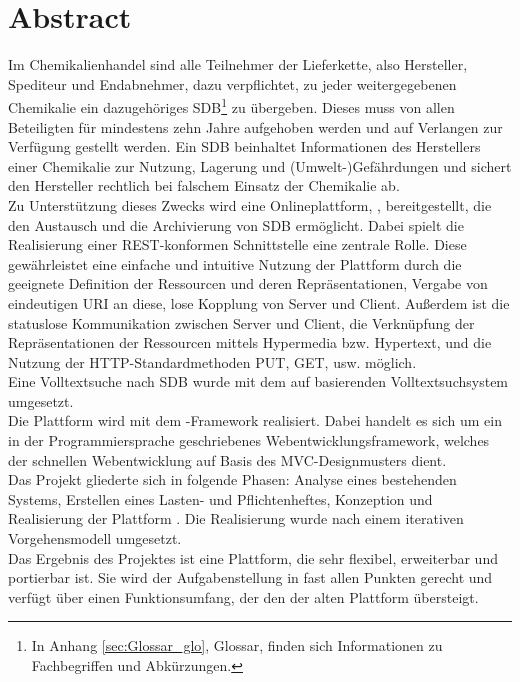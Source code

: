 \section*{Abstract}
\label{abstract}

Im Chemikalienhandel sind alle Teilnehmer der Lieferkette, also Hersteller,
Spediteur und Endabnehmer, dazu verpflichtet, zu jeder weitergegebenen
Chemikalie ein dazugehöriges \ac{SDB}\footnote{In Anhang
\ref{sec:Glossar_glo}, Glossar, finden sich Informationen zu
Fachbegriffen und Abkürzungen.} zu übergeben. Dieses muss von allen Beteiligten
für mindestens zehn Jahre aufgehoben werden und auf Verlangen zur Verfügung
gestellt werden. Ein \ac{SDB} beinhaltet Informationen des Herstellers einer
Chemikalie zur Nutzung, Lagerung und (Umwelt-)Gefährdungen und sichert den
Hersteller rechtlich bei falschem Einsatz der Chemikalie ab.
\\
Zu Unterstützung dieses Zwecks wird eine Onlineplattform, ,
bereitgestellt, die den Austausch und die Archivierung von \ac{SDB} ermöglicht.
Dabei spielt die Realisierung einer \ac{REST}-konformen Schnittstelle eine
zentrale Rolle. Diese gewährleistet eine einfache und intuitive Nutzung der
Plattform durch die geeignete Definition der Ressourcen und deren
Repräsentationen, Vergabe von eindeutigen \ac{URI} an diese, lose Kopplung von
Server und Client. Außerdem ist die statuslose Kommunikation zwischen Server
und Client, die Verknüpfung der Repräsentationen der Ressourcen mittels
Hypermedia bzw. Hypertext, und die Nutzung der \ac{HTTP}-Standardmethoden PUT,
GET, usw. möglich.
\\
Eine Volltextsuche nach \ac{SDB} wurde mit dem auf
 basierenden Volltextsuchsystem  umgesetzt.
\\
Die Plattform wird mit dem
-Framework \cite{DJANGO-2013} realisiert. Dabei
handelt es sich um ein in der Programmiersprache  geschriebenes Webentwicklungsframework,
welches der schnellen Webentwicklung auf Basis des \ac{MVC}-Designmusters dient.
\\
Das Projekt gliederte sich in folgende Phasen: Analyse eines bestehenden Systems,
Erstellen eines Lasten- und Pflichtenheftes, Konzeption und Realisierung der
Plattform . Die Realisierung wurde nach einem iterativen
Vorgehensmodell umgesetzt.
\\
Das Ergebnis des Projektes ist eine Plattform, die sehr flexibel, erweiterbar
und portierbar ist. Sie wird der Aufgabenstellung in fast allen Punkten gerecht
und verfügt über einen Funktionsumfang, der den der alten Plattform übersteigt.
